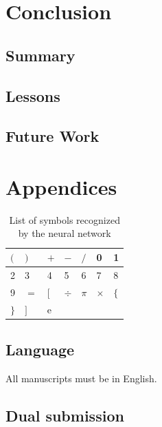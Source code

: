 \documentclass[10pt,twocolumn,letterpaper]{article}
\begin{document}
\section{Conclusion}

\subsection{Summary}


\subsection{Lessons}


\subsection{Future Work}


{\small


}

\section{Appendices}

\begin{table}[h]
\centering
\begin{tabular}{|l|l|l|l|l|l|l|}
\hline
$($ & $)$ & $+$ & $-$ & $/$ & 0 & 1 \\ \hline
2 & 3 & 4 & 5 & 6 & 7 & 8 \\ \hline
9 & $=$ & $[$ & $\div$ & $\pi$ & $\times$ & $\{$ \\ \hline
$\}$ & $]$ & e & $ $ & $ $ & & \\
\hline
\end{tabular}
\caption{List of symbols recognized by the neural network}
\label{tbl:symbollist}
\end{table}



\subsection{Language}

All manuscripts must be in English.

\subsection{Dual submission}
\end{document}
